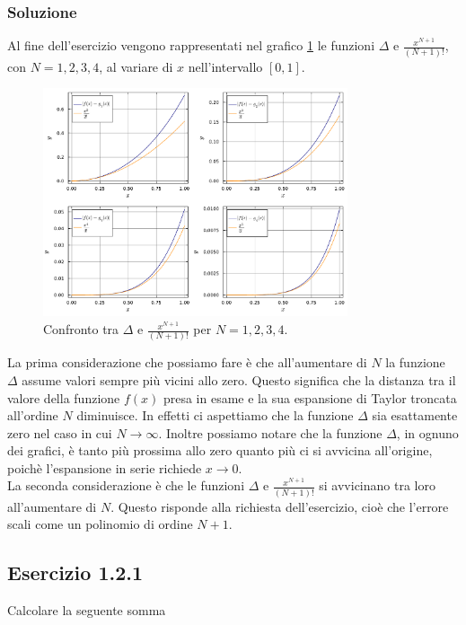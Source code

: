 \documentclass[letterpaper, 12pt]{article}
\begin{document}
\subsubsection{Soluzione}
Al fine dell'esercizio vengono rappresentati nel grafico \ref{fig:es1_0_1_1} le funzioni $\Delta$ e $\frac{x^{N+1}}{(N+1)!}$, con 
$N=1,2,3, 4$, al variare di $x$ nell'intervallo $[0,1]$. 

\begin{figure}[!ht]
    \centering
    \includegraphics[width=0.8\textwidth]{1011.pdf}
    \caption{Confronto tra $\Delta$ e $\frac{x^{N+1}}{(N+1)!}$ per $N=1,2,3, 4$.}
    \label{fig:es1_0_1_1}
\end{figure}

La prima considerazione che possiamo fare è che all'aumentare di $N$ la funzione $\Delta$ 
assume valori sempre più vicini allo zero. Questo significa che la distanza tra il valore 
della funzione $f(x)$ presa in esame e la sua espansione di Taylor troncata all'ordine 
$N$ diminuisce. In effetti ci aspettiamo che la funzione $\Delta$ sia 
esattamente zero nel caso in cui $N \rightarrow \infty$. Inoltre possiamo notare che la funzione $\Delta$, in ognuno
dei grafici, è tanto più prossima allo zero quanto più ci si avvicina all'origine, poichè l'espansione in serie 
richiede $x \rightarrow 0$.\\
La seconda considerazione è che le funzioni $\Delta$ e $\frac{x^{N+1}}{(N+1)!}$ si 
avvicinano tra loro all'aumentare di $N$. Questo risponde alla richiesta dell'esercizio, 
cioè che l'errore scali come un polinomio di ordine $N+1$. 

\subsection{Esercizio 1.2.1}
Calcolare la seguente somma
\end{document}
